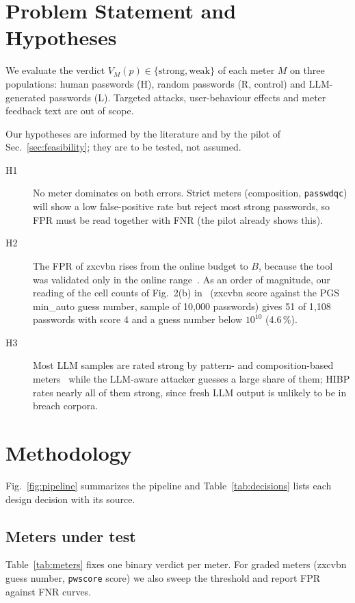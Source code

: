 \documentclass[conference]{IEEEtran}
\begin{document}
\section{Problem Statement and Hypotheses}
We evaluate the verdict $V_M(p)\in\{\text{strong},\text{weak}\}$ of each meter $M$ on three populations: human passwords (H), random passwords (R, control) and LLM-generated passwords (L). Targeted attacks, user-behaviour effects and meter feedback text are out of scope.

Our hypotheses are informed by the literature and by the pilot of Sec.~\ref{sec:feasibility}; they are to be tested, not assumed.
\begin{description}
\item[H1] No meter dominates on both errors. Strict meters (composition, \texttt{passwdqc}) will show a low false-positive rate but reject most strong passwords, so FPR must be read together with FNR (the pilot already shows this).
\item[H2] The FPR of zxcvbn rises from the online budget to $B$, because the tool was validated only in the online range~\cite{wheeler2016}. As an order of magnitude, our reading of the cell counts of Fig.~2(b) in~\cite{golla2018} (zxcvbn score against the PGS min\_auto guess number, sample of 10{,}000 passwords) gives 51 of 1{,}108 passwords with score 4 and a guess number below $10^{10}$ (4.6\,\%).
\item[H3] Most LLM samples are rated strong by pattern- and composition-based meters~\cite{irregular2026} while the LLM-aware attacker guesses a large share of them; HIBP rates nearly all of them strong, since fresh LLM output is unlikely to be in breach corpora.
\end{description}

\section{Methodology}\label{sec:method}

Fig.~\ref{fig:pipeline} summarizes the pipeline and Table~\ref{tab:decisions} lists each design decision with its source.

\subsection{Meters under test}
Table~\ref{tab:meters} fixes one binary verdict per meter. For graded meters (zxcvbn guess number, \texttt{pwscore} score) we also sweep the threshold and report FPR against FNR curves.
\end{document}
